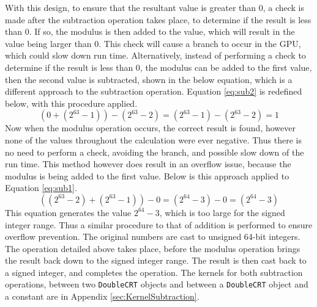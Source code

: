 With this design, to ensure that the resultant value is greater than 0, a check is made after the subtraction operation takes place, to determine if the result is less than 0. If so, the modulus is then added to the value, which will result in the value being larger than 0. This check will cause a branch to occur in the GPU, which could slow down run time. Alternatively, instead of performing a check to determine if the result is less than 0, the modulus can be added to the first value, then the second value is subtracted, shown in the below equation, which is a different approach to the subtraction operation. Equation \ref{eq:sub2} is redefined below, with this procedure applied. 
\begin{equation}
(0 + (2^{63} - 1)) - (2^{63} - 2) = (2^{63} - 1) - (2^{63} - 2) = 1
\end{equation}
Now when the modulus operation occurs, the correct result is found, however none of the values throughout the calculation were ever negative. Thus there is no need to perform a check, avoiding the branch, and possible slow down of the run time. This method however does result in an overflow issue, because the modulus is being added to the first value. Below is this approach applied to Equation \ref{eq:sub1}.
\begin{equation}
((2^{63} - 2) + (2^{63} - 1)) - 0 = (2^{64} - 3) - 0 = (2^{64} - 3)
\end{equation}
This equation generates the value $2^{64} - 3$, which is too large for the signed integer range. Thus a similar procedure to that of addition is performed to ensure overflow prevention. The original numbers are cast to unsigned 64-bit integers. The operation detailed above takes place, before the modulus operation brings the result back down to the signed integer range. The result is then cast back to a signed integer, and completes the operation. The kernels for both subtraction operations, between two \verb|DoubleCRT| objects and between a \verb|DoubleCRT| object and a constant are in Appendix \ref{sec:KernelSubtraction}.

